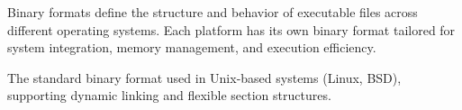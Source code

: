 \begin{NxSSBox}
		\begin{NxIDBox}
				Binary formats define the structure and behavior of executable files across different operating systems. Each platform has its own binary format tailored for system integration, memory management, and execution efficiency.
		\end{NxIDBox}
		\begin{NxIDBoxL}
				 The standard binary format used in Unix-based systems (Linux, BSD), supporting dynamic linking and flexible section structures.
		\end{NxIDBoxL}
\end{NxSSBox}


%
%
